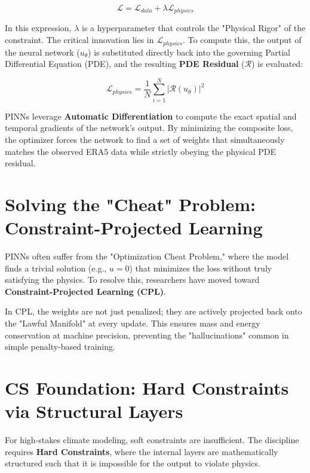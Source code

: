 \begin{equation}
\mathcal{L} = \mathcal{L}_{data} + \lambda \mathcal{L}_{physics}
\end{equation}

In this expression, $\lambda$ is a hyperparameter that controls the "Physical Rigor" of the constraint. The critical innovation lies in $\mathcal{L}_{physics}$. To compute this, the output of the neural network ($u_\theta$) is substituted directly back into the governing Partial Differential Equation (PDE), and the resulting \textbf{PDE Residual} ($\mathcal{R}$) is evaluated:

\begin{equation}
\mathcal{L}_{physics} = \frac{1}{N} \sum_{i=1}^{N} |\mathcal{R}(u_\theta)|^2
\end{equation}

PINNs leverage \textbf{Automatic Differentiation} to compute the exact spatial and temporal gradients of the network's output. By minimizing the composite loss, the optimizer forces the network to find a set of weights that simultaneously matches the observed ERA5 data while strictly obeying the physical PDE residual.

\section{Solving the "Cheat" Problem: Constraint-Projected Learning}

PINNs often suffer from the "Optimization Cheat Problem," where the model finds a trivial solution (e.g., $u=0$) that minimizes the loss without truly satisfying the physics. To resolve this, researchers have moved toward \textbf{Constraint-Projected Learning (CPL)}.

In CPL, the weights are not just penalized; they are actively projected back onto the "Lawful Manifold" at every update. This ensures mass and energy conservation at machine precision, preventing the "hallucinations" common in simple penalty-based training.

\section{CS Foundation: Hard Constraints via Structural Layers}

For high-stakes climate modeling, soft constraints are insufficient. The discipline requires \textbf{Hard Constraints}, where the internal layers are mathematically structured such that it is impossible for the output to violate physics.


